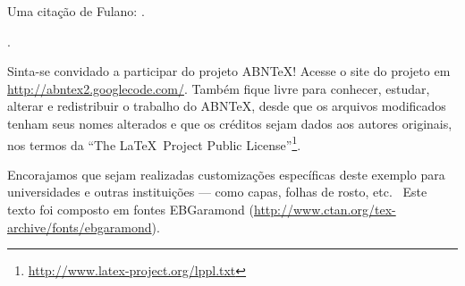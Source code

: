 \documentclass[
	10pt,				%
	openright,			%
	twoside,			%
	a5paper,			%
	english,			%
	french,				%
	spanish,			%
	brazil,				%
]{abntex2}
\begin{document}
Uma citação de Fulano: .

\cite{fulano}.



\backmatter %

\cleardoublepage
\thispagestyle{empty} 

Sinta-se convidado a participar do projeto ABN\TeX! Acesse o site do projeto em
\url{http://abntex2.googlecode.com/}. Também fique livre para conhecer, estudar,
alterar e redistribuir o trabalho do ABN\TeX, desde que os arquivos modificados
tenham seus nomes alterados e que os créditos sejam dados aos autores originais,
nos termos da ``The \LaTeX\ Project Public
License''\footnote{\url{http://www.latex-project.org/lppl.txt}}.

Encorajamos que sejam realizadas customizações específicas deste exemplo para
universidades e outras instituições --- como capas, folhas de rosto, etc.
~\vfill Este texto foi composto em fontes EBGaramond
(\url{http://www.ctan.org/tex-archive/fonts/ebgaramond}).
\end{document}
